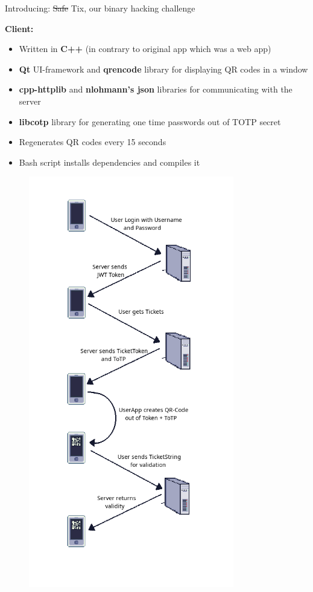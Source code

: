 \documentclass[final,dvipsnames]{beamer}
\newcommand{\soutthick}[1]{%
    \renewcommand{\ULthickness}{4pt}%
       \sout{#1}%
    \renewcommand{\ULthickness}{.4pt}%
}
\newlength{\colwidth}
\begin{document}
\begin{frame}[t, fragile]
\begin{columns}[t]
\begin{column}{\colwidth}
\begin{block}{Introducing: \soutthick{Safe}Tix, our binary hacking challenge}
\begin{itemize}
            \textbf{Client:}
            \begin{itemize}
                \item Written in \textbf{C++} (in contrary to original app which was a web app)
                \item \textbf{Qt} UI-framework and \textbf{qrencode} library for displaying QR codes in a window
                \item \textbf{cpp-httplib} and \textbf{nlohmann's json} libraries for communicating with the server
                \item \textbf{libcotp} library for generating one time passwords out of TOTP secret
                \item Regenerates QR codes every 15 seconds
                \item Bash script installs dependencies and compiles it
            \end{itemize}
            \begin{figure}[h]
				\centering
				\includegraphics[width=0.8\textwidth]{../figures/Workflow_v2.png}

\end{figure}
\end{itemize}
\end{block}
\end{column}
\end{columns}
\end{frame}
\end{document}
